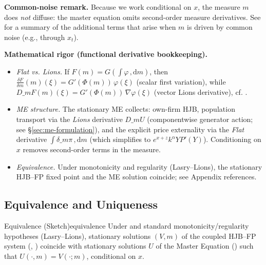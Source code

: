 \documentclass[11pt,letterpaper,oneside]{article}
\numberwithin{equation}{section}
\newcommand{\ac}[1]{{\mdseries\textsc{#1}}}
\newcommand{\1}{\mathbf{1}}
\newcommand{\diff}{,\mathrm{d}}
\newcommand{\Dm}{D\_m}
\begin{document}
\begin{tcolorbox}[didacticstyle]
\textbf{Common-noise remark.} Because we work conditional on $x$, the measure $m$ does \emph{not} diffuse: the master equation omits second-order measure derivatives. See  for a summary of the additional terms that arise when $m$ is driven by common noise (e.g., through $x_t$).
\end{tcolorbox}

\begin{tcolorbox}[mathstyle]
\textbf{Mathematical rigor (functional derivative bookkeeping).}
\begin{itemize}[leftmargin=1.15em,itemsep=0.25em]
  \item \emph{Flat vs. Lions.} If $F(m)=G\!\left(\int \varphi\,\diff m\right)$, then
  $\tfrac{\delta F}{\delta m}(m)(\xi)=G'(\Phi(m))\,\varphi(\xi)$ (scalar first variation),
  while $\Dm F(m)(\xi)=G'(\Phi(m))\,\nabla\varphi(\xi)$ (vector Lions derivative), cf. .
  \item \emph{ME structure.} The stationary ME collects: own-firm HJB, population transport via the \emph{Lions} derivative $\Dm U$ (componentwise generator action; see \S\ref{sec:me-formulation}), and the explicit price externality via the \emph{Flat} derivative $\int \delta\_m \pi\,\diff m$ (which simplifies to $e^{x+z}k^\alpha Y P'(Y)$). Conditioning on $x$ removes second-order terms in the measure.
  \item \emph{Equivalence.} Under monotonicity and regularity (Lasry--Lions), the stationary HJB--FP fixed point and the ME solution coincide; see Appendix references.
\end{itemize}
\end{tcolorbox}

\subsection{Equivalence and Uniqueness}

\begin{theorem}{Equivalence (Sketch)}{equivalence}
Under  and standard monotonicity/regularity hypotheses (Lasry--Lions), stationary solutions $(V,m)$ of the coupled \ac{HJB}--\ac{FP} system (, ) coincide with stationary solutions $U$ of the Master Equation () such that $U(\cdot, m) = V(\cdot; m)$, conditional on $x$.
\end{theorem}
\end{document}
